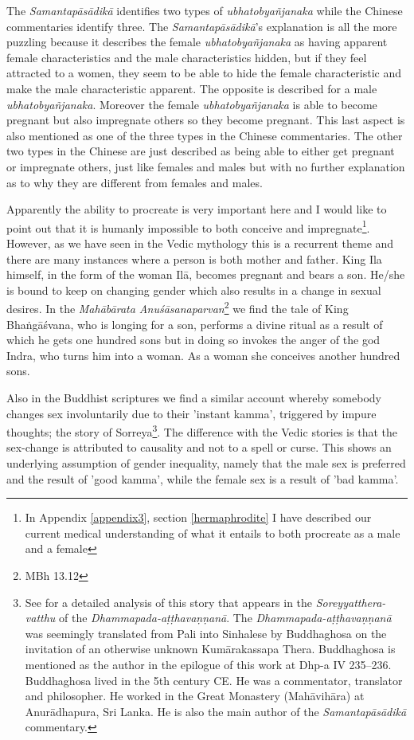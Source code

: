 The {\em Samantapāsādikā} identifies two types of {\em ubhatob­yañ­janaka} while the Chinese commentaries identify three. The {\em Samantapāsādikā}'s explanation is all the more puzzling because it describes the female {\em ubhatob­yañ­janaka} as having apparent female characteristics and the male characteristics hidden, but if they feel attracted to a women, they seem to be able to hide the female characteristic and make the male characteristic apparent. The opposite is described for a male {\em ubhatob­yañ­janaka}. Moreover the female {\em ubhatob­yañ­janaka} is able to become pregnant but also impregnate others so they become pregnant. This last aspect is also mentioned as one of the three types in the Chinese commentaries. The other two types in the Chinese are just described as being able to either get pregnant or impregnate others, just like females and males but with no further explanation as to why they are different from females and males. 

Apparently the ability to procreate is very important here and I would like to point out that it is humanly impossible to both conceive and impregnate\footnote{In Appendix \ref{appendix3}, section \ref{hermaphrodite} I have described our current medical understanding of what it entails to both procreate as a male and a female}. However, as we have seen in the Vedic mythology this is a recurrent theme and there are many instances where a person is both mother and father. King Ila himself, in the form of the woman Ilā, becomes pregnant and bears a son. He/she is bound to keep on changing gender which also results in a change in sexual desires. In the {\em Mahābārata Anuśāsanaparvan}\footnote{MBh 13.12} we find the tale of King Bhaṅgāśvana, who is longing for a son, performs a divine ritual as a result of which he gets one hundred sons but in doing so invokes the anger of the god Indra, who turns him into a woman. As a woman she conceives another hundred sons. 

Also in the Buddhist scriptures we find a similar account whereby somebody changes sex involuntarily due to their 'instant kamma', triggered by impure thoughts; the story of Sorreya\footnote{See \cite{dhammadinna} for a detailed analysis of this story that appears in the {\em Soreyyatthera-vatthu} of the {\em Dhammapada-aṭṭhavaṇṇanā}. The {\em Dhammapada-aṭṭhavaṇṇanā} was seemingly translated from Pali into Sinhalese by Buddhaghosa on the invitation of an otherwise unknown Kumārakassapa Thera. Buddhaghosa is mentioned as the author in the epilogue of this work at Dhp-a IV 235–236. Buddhaghosa lived in the 5th century CE. He was a commentator, translator and philosopher. He worked in the Great Monastery (Mahāvihāra) at Anurādhapura, Sri Lanka. He is also the main author of the {\em Samantapāsādikā} commentary.}. The difference with the Vedic stories is that the sex-change is attributed to causality and not to a spell or curse. This shows an underlying assumption of gender inequality, namely that the male sex is preferred and the result of 'good kamma', while the female sex is a result of 'bad kamma'.

